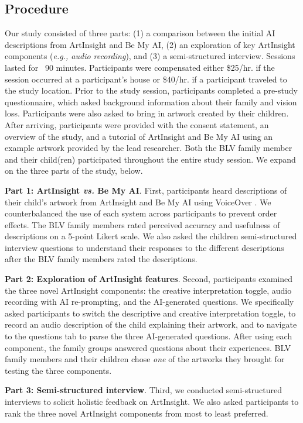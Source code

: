 \documentclass[sigconf]{acmart}
\begin{document}
\subsection{Procedure}
Our study consisted of three parts: (1) a comparison between the initial AI descriptions from ArtInsight and Be My AI, (2) an exploration of key ArtInsight components (\textit{e.g., audio recording}), and (3) a semi-structured interview. Sessions lasted for ~90 minutes. Participants were compensated either \$25/hr. if the session occurred at a participant's house or \$40/hr. if a participant traveled to the study location. Prior to the study session, participants completed a pre-study questionnaire, which asked background information about their family and vision loss. Participants were also asked to bring in artwork created by their children. After arriving, participants were provided with the consent statement, an overview of the study, and a tutorial of ArtInsight and Be My AI using an example artwork provided by the lead researcher. Both the BLV family member and their child(ren) participated throughout the entire study session. We expand on the three parts of the study, below.

\textbf{Part 1: ArtInsight \textit{vs.} Be My AI}. First, participants heard descriptions of their child's artwork from ArtInsight and Be My AI using VoiceOver \cite{voiceoverios}. We counterbalanced the use of each system across participants to prevent order effects. The BLV family members rated perceived accuracy and usefulness of descriptions on a 5-point Likert scale. We also asked the children semi-structured interview questions to understand their responses to the different descriptions after the BLV family members rated the descriptions.

\textbf{Part 2: Exploration of ArtInsight features}. Second, participants examined the three novel ArtInsight components: the creative interpretation toggle, audio recording with AI re-prompting, and the AI-generated questions. We specifically asked participants to switch the descriptive and creative interpretation toggle, to record an audio description of the child explaining their artwork, and to navigate to the questions tab to parse the three AI-generated questions. After using each component, the family groups answered questions about their experiences. BLV family members and their children chose \textit{one} of the artworks they brought for testing the three components.

\textbf{Part 3: Semi-structured interview}. Third, we conducted semi-structured interviews to solicit holistic feedback on ArtInsight. We also asked participants to rank the three novel ArtInsight components from most to least preferred.
\end{document}
